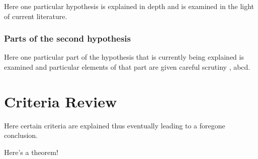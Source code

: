 Here one particular hypothesis is explained in depth
and is examined in the light of current literature.

\subsubsection{Parts of the second hypothesis}

Here one particular part of the hypothesis that is
currently being explained is examined and particular
elements of that part are given careful scrutiny
\autocite{buiEveryGeneratingPolytope2023}, abcd.

\section{Criteria Review}

Here certain criteria are explained thus eventually
leading to a foregone conclusion.
\begin{theorem}
    Here's a theorem!
\end{theorem}

\printbibliography[heading=subbibnumbered]
